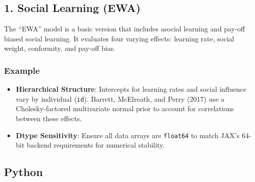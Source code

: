 \documentclass[
  letterpaper,
  DIV=11,
  numbers=noendperiod]{scrartcl}
\providecommand{\tightlist}{%
  \setlength{\itemsep}{0pt}\setlength{\parskip}{0pt}}\usepackage{longtable,booktabs,array}
\begin{document}
\subsection{1. Social Learning (EWA)}\label{social-learning-ewa}

The ``EWA'' model is a basic version that includes asocial learning and
pay-off biased social learning. It evaluates four varying effects:
learning rate, social weight, conformity, and pay-off bias.

\subsubsection{Example}\label{example}

\begin{tcolorbox}[enhanced jigsaw, colback=white, toprule=.15mm, coltitle=black, colframe=quarto-callout-note-color-frame, breakable, opacityback=0, bottomrule=.15mm, leftrule=.75mm, opacitybacktitle=0.6, colbacktitle=quarto-callout-note-color!10!white, title=\textcolor{quarto-callout-note-color}{\faInfo}\hspace{0.5em}{Note}, left=2mm, bottomtitle=1mm, toptitle=1mm, titlerule=0mm, arc=.35mm, rightrule=.15mm]

\begin{itemize}
\tightlist
\item
  \textbf{Hierarchical Structure}: Intercepts for learning rates and
  social influence vary by individual (\texttt{id}). Barrett, McElreath,
  and Perry (2017) use a Cholesky-factored multivariate normal prior to
  account for correlations between these effects.
\item
  \textbf{Dtype Sensitivity}: Ensure all data arrays are
  \texttt{float64} to match JAX's 64-bit backend requirements for
  numerical stability.
\end{itemize}

\end{tcolorbox}

\subsection{Python}
\end{document}
